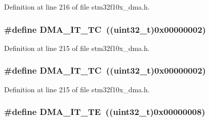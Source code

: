 Definition at line 216 of file stm32f10x\+\_\+dma.\+h.

\subsubsection[{\texorpdfstring{D\+M\+A\+\_\+\+I\+T\+\_\+\+TC}{DMA_IT_TC}}]{\setlength{\rightskip}{0pt plus 5cm}\#define D\+M\+A\+\_\+\+I\+T\+\_\+\+TC~(({\bf uint32\+\_\+t})0x00000002)}\hypertarget{group___d_m_a__interrupts__definition_ga06e83dd277e0d3e5635cf8ce8dfd6e16}{}\label{group___d_m_a__interrupts__definition_ga06e83dd277e0d3e5635cf8ce8dfd6e16}


Definition at line 215 of file stm32f10x\+\_\+dma.\+h.

\subsubsection[{\texorpdfstring{D\+M\+A\+\_\+\+I\+T\+\_\+\+TC}{DMA_IT_TC}}]{\setlength{\rightskip}{0pt plus 5cm}\#define D\+M\+A\+\_\+\+I\+T\+\_\+\+TC~(({\bf uint32\+\_\+t})0x00000002)}\hypertarget{group___d_m_a__interrupts__definition_ga06e83dd277e0d3e5635cf8ce8dfd6e16}{}\label{group___d_m_a__interrupts__definition_ga06e83dd277e0d3e5635cf8ce8dfd6e16}


Definition at line 215 of file stm32f10x\+\_\+dma.\+h.

\subsubsection[{\texorpdfstring{D\+M\+A\+\_\+\+I\+T\+\_\+\+TE}{DMA_IT_TE}}]{\setlength{\rightskip}{0pt plus 5cm}\#define D\+M\+A\+\_\+\+I\+T\+\_\+\+TE~(({\bf uint32\+\_\+t})0x00000008)}\hypertarget{group___d_m_a__interrupts__definition_gaf9d92649d2a0146f663ff253d8f3b59e}{}\label{group___d_m_a__interrupts__definition_gaf9d92649d2a0146f663ff253d8f3b59e}


